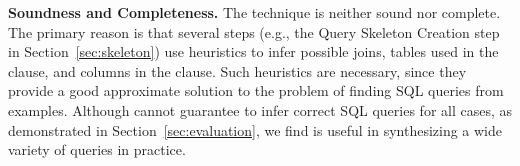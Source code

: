 \noindent \textbf{Soundness and Completeness.} The \ourtool
technique is neither sound nor complete. The primary
reason is that several steps (e.g., the Query Skeleton Creation
step in Section~\ref{sec:skeleton}) use heuristics
to infer possible joins, tables used in the  clause,
and columns in the  clause.
Such heuristics are necessary, since they provide a
good approximate solution to the problem of finding SQL queries
from examples. %
Although \ourtool cannot guarantee to infer correct SQL queries
for all cases, as demonstrated in Section~\ref{sec:evaluation},
we find \ourtool
is useful in synthesizing a wide variety of queries in practice.


